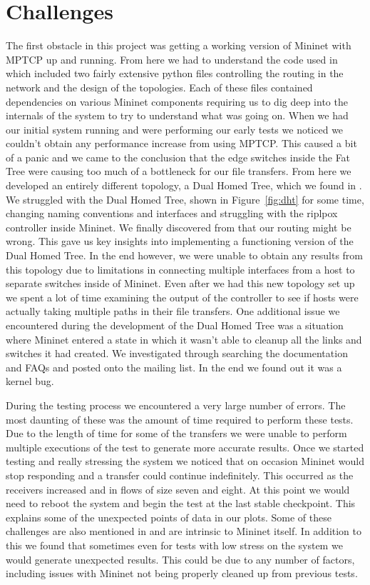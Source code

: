 \documentclass[10pt]{report}
\begin{document}
\section{Challenges}
The first obstacle in this project was getting a working version of
Mininet with MPTCP up and running. From here we had to understand the
code used in \cite{datacenter} which included two fairly extensive
python files controlling the routing in the network and the design of
the topologies. Each of these files contained dependencies on various
Mininet components requiring us to dig deep into the internals of the
system to try to understand what was going on. When we had our initial
system running and were performing our early tests we noticed we
couldn't obtain any performance increase from using MPTCP. This caused
a bit of a
panic and we came to the conclusion that the edge switches inside the
Fat Tree were causing too much of a bottleneck for our file
transfers. From here we developed an entirely different topology, a
Dual Homed Tree, which we found in \cite{mptcp}\cite{dht}. We
struggled with the Dual Homed Tree, shown in Figure~\ref{fig:dht} for
some time, changing naming
conventions and interfaces and struggling with the riplpox controller
inside Mininet. We finally discovered from \cite{scalable} that
our routing might be wrong. This gave us key insights into
implementing a functioning version of the Dual Homed Tree. In the end
however, we were unable to obtain any results from this topology due
to limitations in connecting multiple interfaces from a host to
separate switches inside of Mininet. Even after we had this new
topology set up we spent a lot of time examining the output of the
controller to see if hosts were actually taking multiple paths in
their file transfers. One additional issue we encountered during the
development of the Dual Homed Tree was a situation where Mininet
entered a state in which it wasn't able to cleanup all the links and
switches it had created. We investigated through searching the
documentation and FAQs and posted onto the mailing list. In the end we
found out it was a kernel bug.

During the testing process we encountered a very large number of
errors. The most daunting of these was the amount of time required to
perform these tests. Due to the length of time for some of the
transfers we were unable to perform multiple executions of the test to
generate more accurate results. Once we started testing and really
stressing the system we noticed that on occasion Mininet would stop
responding and a transfer could continue indefinitely. This occurred
as the receivers increased and in flows of size seven and eight. At
this point we would need to reboot the system and begin the test at
the last stable checkpoint. This explains some of the unexpected
points of data in our plots. Some of these challenges are also
mentioned in \cite{datacenter} and are intrinsic to Mininet itself. In
addition to this we found that sometimes even for tests with low
stress on the system we would generate unexpected results. This could
be due to any number of factors, including issues with Mininet not
being properly cleaned up from previous tests.
\end{document}
